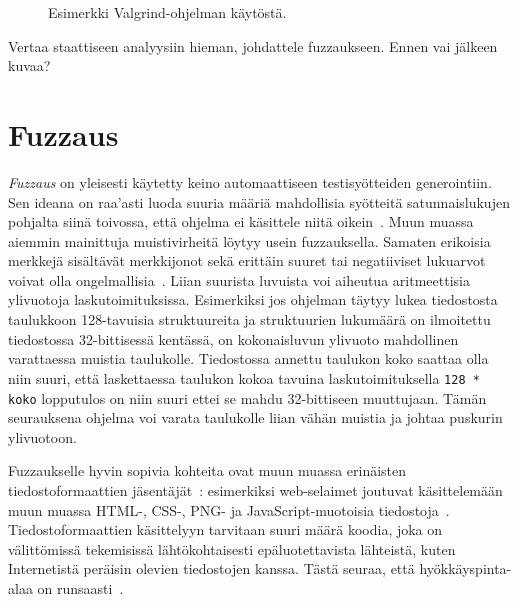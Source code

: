 \begin{figure}[H]



\caption{Esimerkki Valgrind-ohjelman käytöstä.}
\label{ValgrindEsimerkki}
\end{figure}

Vertaa staattiseen analyysiin hieman, johdattele fuzzaukseen.
Ennen vai jälkeen kuvaa?

\section{Fuzzaus}
\label{Fuzzaus}

\emph{Fuzzaus} on yleisesti käytetty keino automaattiseen testisyötteiden generointiin.
Sen ideana on raa'asti luoda suuria määriä mahdollisia syötteitä satunnaislukujen pohjalta siinä toivossa,
että ohjelma ei käsittele niitä oikein~\cite{UnixReliability}.
Muun muassa aiemmin mainittuja muistivirheitä löytyy usein fuzzauksella.
Samaten erikoisia merkkejä sisältävät merkkijonot sekä erittäin suuret tai negatiiviset lukuarvot
voivat olla ongelmallisia~\cite{ViolatingAssumptions}.
Liian suurista luvuista voi aiheutua aritmeettisia ylivuotoja laskutoimituksissa.
Esimerkiksi jos ohjelman täytyy lukea tiedostosta taulukkoon 128-tavuisia struktuureita
ja struktuurien lukumäärä on ilmoitettu tiedostossa 32-bittisessä kentässä,
on kokonaisluvun ylivuoto mahdollinen varattaessa muistia taulukolle.
Tiedostossa annettu taulukon koko saattaa olla niin suuri,
että laskettaessa taulukon kokoa tavuina laskutoimituksella \texttt{128 * koko}
lopputulos on niin suuri ettei se mahdu 32-bittiseen muuttujaan.
Tämän seurauksena ohjelma voi varata taulukolle liian vähän muistia
ja johtaa puskurin ylivuotoon.

Fuzzaukselle hyvin sopivia kohteita ovat muun muassa erinäisten tiedostoformaattien jäsentäjät~\cite{SageArtikkeli,OuluBrowser}:
esimerkiksi web-selaimet joutuvat käsittelemään muun muassa
HTML-, CSS-, PNG- ja JavaScript-muotoisia tiedostoja~\cite{OuluBrowser}.
Tiedostoformaattien käsittelyyn tarvitaan suuri määrä koodia,
joka on välittömissä tekemisissä lähtökohtaisesti epäluotettavista lähteistä, kuten Internetistä peräisin olevien tiedostojen kanssa.
Tästä seuraa, että hyökkäyspinta-alaa on runsaasti~\cite{OuluBrowser}.

